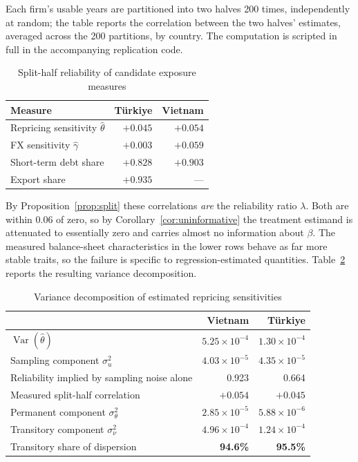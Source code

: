 \documentclass[review,12pt,authoryear]{elsarticle}
\theoremstyle{plain}
\theoremstyle{definition}
\newcommand{\Var}{\operatorname{Var}}
\begin{document}
\begin{table}[htbp]
\centering
\caption{Split-half reliability of candidate exposure measures}
\label{tab:split}
\noindent\footnotesize Each firm's usable years are partitioned into two
halves 200 times, independently at random; the table reports the
correlation between the two halves' estimates, averaged across the 200
partitions, by country. The computation is scripted in full in the
accompanying replication code.\par\vspace{0.4em}
\begin{tabular}{lrr}
\toprule
Measure & T\"{u}rkiye & Vietnam \\
\midrule
Repricing sensitivity $\widehat{\theta}$ & $\mathbf{+0.045}$ & $\mathbf{+0.054}$ \\
FX sensitivity $\widehat{\gamma}$        & $+0.003$ & $+0.059$ \\
Short-term debt share                    & $+0.828$ & $+0.903$ \\
Export share                             & $+0.935$ & --- \\
\bottomrule
\end{tabular}
\end{table}

By Proposition~\ref{prop:split} these correlations \emph{are} the reliability
ratio $\lambda$. Both are within 0.06 of zero, so by
Corollary~\ref{cor:uninformative} the treatment estimand is attenuated to
essentially zero and carries almost no information about $\beta$. The measured
balance-sheet characteristics in the lower rows behave as far more stable
traits, so the failure is specific to regression-estimated quantities.
Table~\ref{tab:decomp} reports the resulting variance decomposition.

\begin{table}[htbp]
\centering
\caption{Variance decomposition of estimated repricing sensitivities}
\label{tab:decomp}
\begin{tabular}{lrr}
\toprule
& Vietnam & T\"{u}rkiye \\
\midrule
$\Var(\widehat{\theta})$                       & $5.25\times10^{-4}$ & $1.30\times10^{-4}$ \\
Sampling component $\sigma^2_u$                & $4.03\times10^{-5}$ & $4.35\times10^{-5}$ \\
Reliability implied by sampling noise alone    & 0.923 & 0.664 \\
Measured split-half correlation                & $+0.054$ & $+0.045$ \\
Permanent component $\sigma^2_\theta$          & $2.85\times10^{-5}$ & $5.88\times10^{-6}$ \\
Transitory component $\sigma^2_\nu$            & $4.96\times10^{-4}$ & $1.24\times10^{-4}$ \\
Transitory share of dispersion                 & \textbf{94.6\%} & \textbf{95.5\%} \\
\bottomrule
\end{tabular}
\end{table}
\end{document}
